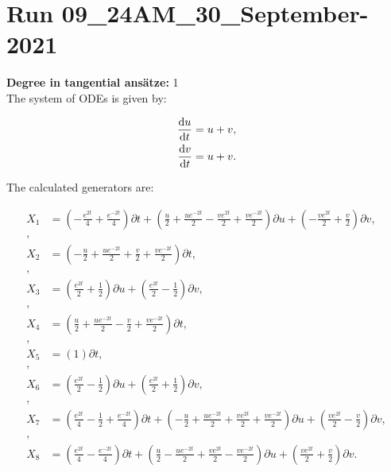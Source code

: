 \section*{Run 09\_24AM\_30\_September-2021}
\textbf{Degree in tangential ansätze:}	1\\
The system of ODEs is given by:

\begin{align*}
\dv{u}{t}&=u + v,\\
\dv{v}{t}&=u + v.\\
\end{align*}

\noindent The calculated generators are:

\begin{align*}
X_{1}&=\left( - \frac{e^{2 t}}{4} + \frac{e^{- 2 t}}{4} \right)\partial t+\left( \frac{u}{2} + \frac{u e^{- 2 t}}{2} - \frac{v e^{2 t}}{2} + \frac{v e^{- 2 t}}{2} \right)\partial u+\left( - \frac{v e^{2 t}}{2} + \frac{v}{2} \right)\partial v,\\
,\\
X_{2}&=\left( - \frac{u}{2} + \frac{u e^{- 2 t}}{2} + \frac{v}{2} + \frac{v e^{- 2 t}}{2} \right)\partial t,\\
,\\
X_{3}&=\left( \frac{e^{2 t}}{2} + \frac{1}{2} \right)\partial u+\left( \frac{e^{2 t}}{2} - \frac{1}{2} \right)\partial v,\\
,\\
X_{4}&=\left( \frac{u}{2} + \frac{u e^{- 2 t}}{2} - \frac{v}{2} + \frac{v e^{- 2 t}}{2} \right)\partial t,\\
,\\
X_{5}&=\left( 1 \right)\partial t,\\
,\\
X_{6}&=\left( \frac{e^{2 t}}{2} - \frac{1}{2} \right)\partial u+\left( \frac{e^{2 t}}{2} + \frac{1}{2} \right)\partial v,\\
,\\
X_{7}&=\left( \frac{e^{2 t}}{4} - \frac{1}{2} + \frac{e^{- 2 t}}{4} \right)\partial t+\left( - \frac{u}{2} + \frac{u e^{- 2 t}}{2} + \frac{v e^{2 t}}{2} + \frac{v e^{- 2 t}}{2} \right)\partial u+\left( \frac{v e^{2 t}}{2} - \frac{v}{2} \right)\partial v,\\
,\\
X_{8}&=\left( \frac{e^{2 t}}{4} - \frac{e^{- 2 t}}{4} \right)\partial t+\left( \frac{u}{2} - \frac{u e^{- 2 t}}{2} + \frac{v e^{2 t}}{2} - \frac{v e^{- 2 t}}{2} \right)\partial u+\left( \frac{v e^{2 t}}{2} + \frac{v}{2} \right)\partial v.\\
\end{align*}
